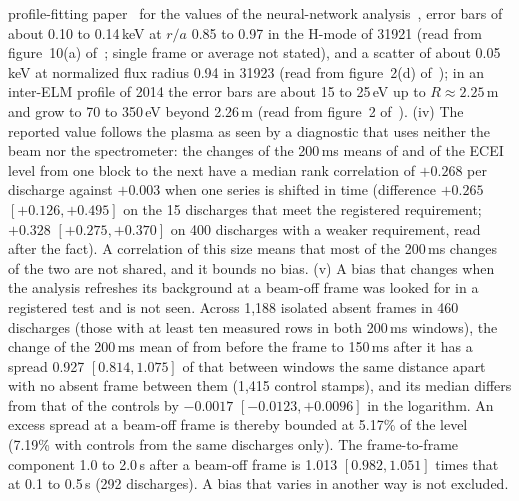 profile-fitting paper~\citep{Kim2026AutomatedOutlier} for the values of the
neural-network analysis~\citep{Lee2026NeuralNetworkbased}, error bars of about 0.10 to 0.14\,keV at $r/a$
0.85 to 0.97 in the H-mode of 31921 (read from figure~10(a) of~\citep{Na2026FireMode};
single frame or average not stated), and a scatter of about 0.05\,keV at normalized
flux radius 0.94 in 31923 (read from figure~2(d) of~\citep{Heo2025ExperimentalIdentification});
in an inter-ELM profile of 2014 the error bars are about 15 to 25\,eV up to
$R \approx 2.25$\,m and grow to 70 to 350\,eV beyond 2.26\,m (read from figure~2
of~\citep{Ko2016CharacteristicsToroidal}).
(iv) The reported value follows the plasma
as seen by a diagnostic that uses neither the beam nor the spectrometer: the changes
of the 200\,ms means of \Ti{} and of the ECEI level from one block to the next have a
median rank correlation of $+0.268$ per discharge against $+0.003$ when one series is
shifted in time (difference $+0.265$ $[+0.126, +0.495]$ on the 15 discharges that
meet the registered requirement; $+0.328$ $[+0.275, +0.370]$ on 400 discharges with a
weaker requirement, read after the fact). A correlation of this size means that most
of the 200\,ms changes of the two are not shared, and it bounds no bias. (v) A bias
that changes when the analysis refreshes its background at a beam-off frame was
looked for in a registered test and is not seen. Across 1{,}188 isolated absent
frames in 460 discharges (those with at least ten measured \Ti{} rows in both 200\,ms
windows), the change of the 200\,ms mean of \Ti{} from before the
frame to 150\,ms after it has a spread 0.927 $[0.814, 1.075]$ of that between windows
the same distance apart with no absent frame between them (1{,}415 control stamps),
and its median differs from that of the controls by $-0.0017$ $[-0.0123, +0.0096]$
in the logarithm. An excess spread at a beam-off frame is thereby bounded at 5.17\%
of the level (7.19\% with controls from the same discharges only). The frame-to-frame
component 1.0 to 2.0\,s after a beam-off frame is 1.013 $[0.982, 1.051]$ times that
at 0.1 to 0.5\,s (292 discharges). A bias that varies in another way is not excluded.
